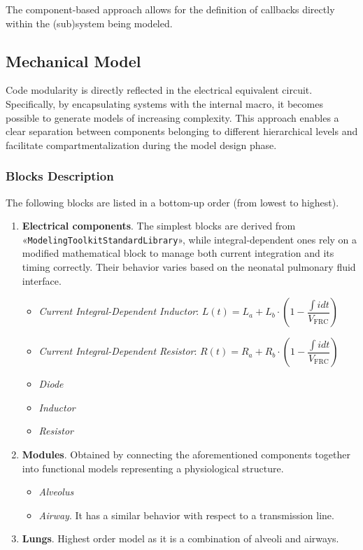 The component-based approach allows for the definition of callbacks
directly within the (sub)system being modeled.


\subsection{Mechanical Model}
\label{subsec:morphometric_model}

Code modularity is directly reflected in the electrical equivalent
circuit.  Specifically, by encapsulating systems with the internal
 macro, it becomes possible to generate models of
increasing complexity.  This approach enables a clear separation
between components belonging to different hierarchical levels and
facilitate compartmentalization during the model design phase.

\subsubsection{Blocks Description}
\label{subsubsec:blocks_description}


The following blocks are listed in a bottom-up order (from lowest to
highest).

\begin{enumerate}
\item \textbf{Electrical components}.  The simplest blocks are derived
  from «\texttt{ModelingToolkitStandardLibrary}», while
  integral-dependent ones rely on a modified mathematical block to
  manage both current integration and its timing correctly.  Their
  behavior varies based on the neonatal pulmonary fluid interface.
  \begin{itemize}
  \item \emph{Current Integral-Dependent Inductor}:
    $L(t) = L_{a} + L_{b}\cdot \left(1 - \dfrac{\int {i
          dt}}{V_{\text{FRC}}}\right)$
  \item \emph{Current Integral-Dependent Resistor}:
    $R(t) = R_{a} + R_{b}\cdot \left(1 - \dfrac{\int {i
          dt}}{V_{\text{FRC}}}\right)$
  \item \emph{Diode}
  \item \emph{Inductor}
  \item \emph{Resistor}
  \end{itemize}
\item \textbf{Modules}.  Obtained by connecting the aforementioned
  components together into functional models representing a
  physiological structure.
  \begin{itemize}
  \item
    \emph{Alveolus}
  \item \emph{Airway}.  It has a similar behavior with respect to a
    transmission line.
  \end{itemize}
\item \textbf{Lungs}.  Highest order model as it is a combination of
  alveoli and airways.
\end{enumerate}

